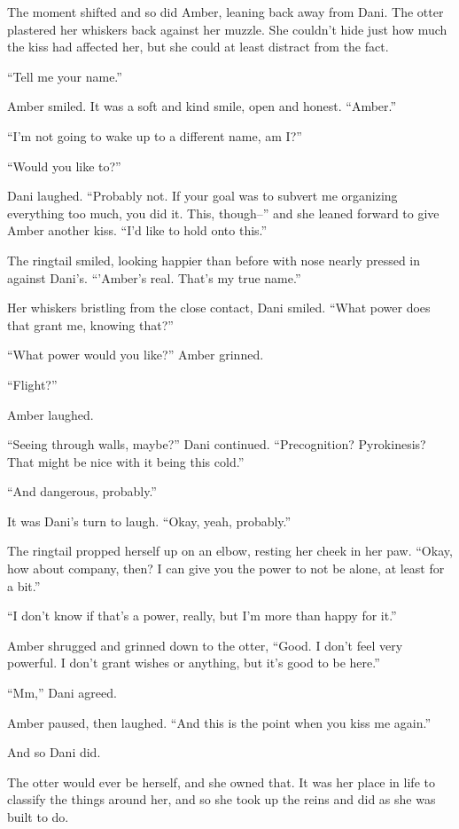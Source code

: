 The moment shifted and so did Amber, leaning back away from Dani. The otter plastered her whiskers back against her muzzle. She couldn't hide just how much the kiss had affected her, but she could at least distract from the fact.

``Tell me your name.''

Amber smiled. It was a soft and kind smile, open and honest. ``Amber.''

``I'm not going to wake up to a different name, am I?''

``Would you like to?''

Dani laughed. ``Probably not. If your goal was to subvert me organizing everything too much, you did it. This, though--'' and she leaned forward to give Amber another kiss. ``I'd like to hold onto this.''

The ringtail smiled, looking happier than before with nose nearly pressed in against Dani's. ``'Amber's real. That's my true name.''

Her whiskers bristling from the close contact, Dani smiled. ``What power does that grant me, knowing that?''

``What power would you like?'' Amber grinned.

``Flight?''

Amber laughed.

``Seeing through walls, maybe?'' Dani continued. ``Precognition? Pyrokinesis? That might be nice with it being this cold.''

``And dangerous, probably.''

It was Dani's turn to laugh. ``Okay, yeah, probably.''

The ringtail propped herself up on an elbow, resting her cheek in her paw. ``Okay, how about company, then? I can give you the power to not be alone, at least for a bit.''

``I don't know if that's a power, really, but I'm more than happy for it.''

Amber shrugged and grinned down to the otter, ``Good. I don't feel very powerful. I don't grant wishes or anything, but it's good to be here.''

``Mm,'' Dani agreed.

Amber paused, then laughed. ``And this is the point when you kiss me again.''

And so Dani did.

The otter would ever be herself, and she owned that. It was her place in life to classify the things around her, and so she took up the reins and did as she was built to do.

